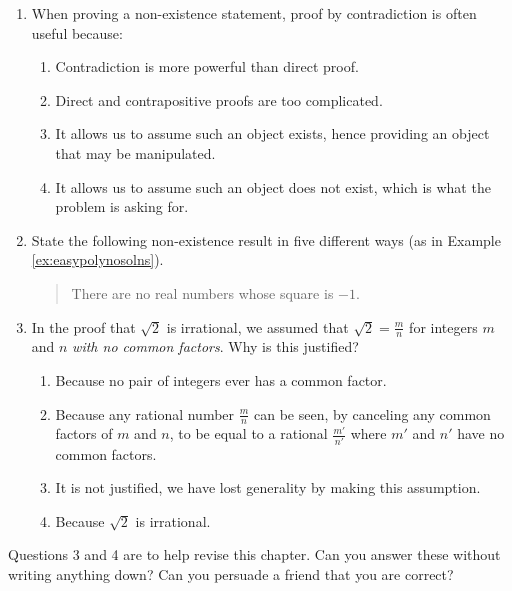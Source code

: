 \pagestyle{empty}


\begin{enumerate}
  \item When proving a non-existence statement, proof by contradiction is often useful because:
  \begin{enumerate}
    \item Contradiction is more powerful than direct proof.
    \item Direct and contrapositive proofs are too complicated.
    \item It allows us to assume such an object exists, hence providing an object that may be manipulated.
    \item It allows us to assume such an object does not exist, which is what the problem is asking for.
  \end{enumerate}
  
  
	\item State the following non-existence result in five different ways (as in Example \ref*{ex:easypolynosolns}).
	\begin{quote}
		There are no real numbers whose square is $-1$.
	\end{quote}
  
  
  \item In the proof that $\sqrt{2}$ is irrational, we assumed that $\sqrt{2}=\frac{m}{n}$ for integers $m$ and $n$ \emph{with no common factors}. Why is this justified?
  \begin{enumerate}
      \item Because no pair of integers ever has a common factor.
      \item Because any rational number $\frac mn$ can be seen, by canceling any common factors of $m$ and $n$, to be equal to a rational $\frac{m'}{n'}$ where $m'$ and $n'$ have no common factors.
      \item It is not justified, we have lost generality by making this assumption.
      \item Because $\sqrt{2}$ is irrational.
  \end{enumerate}
\end{enumerate}


Questions 3 and 4 are to help revise this chapter. Can you answer these without writing anything down? Can you persuade a friend that you are correct?

